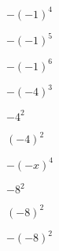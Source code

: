 
\begin{BloqueEjercicios}
  \begin{ej3col}
    \item $-(-1)^4$
    \item $-(-1)^5$
    \item $-(-1)^6$
    \item $-(-4)^3$
    \item $-4^2$
    \item $(-4)^2$
    \item $-(-x)^4$
    \item $-8^2$
    \item $(-8)^2$
    \item $-(-8)^2$
  \end{ej3col}
\end{BloqueEjercicios}
